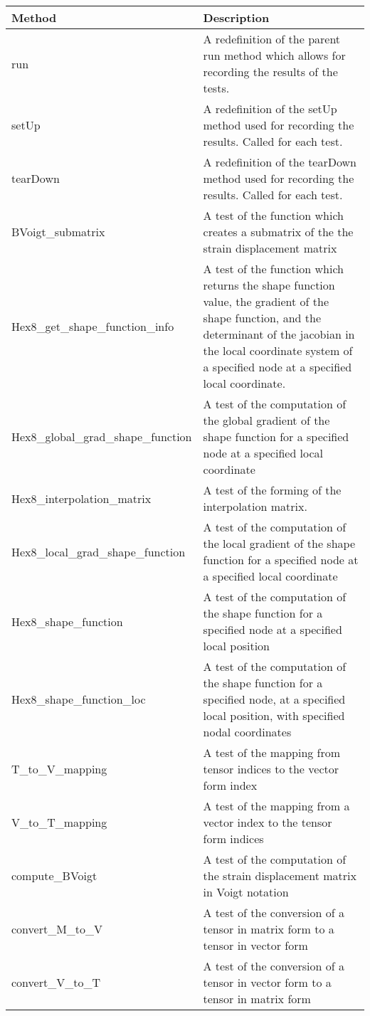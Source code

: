 \documentclass{asme2ej}
\begin{document}
\begin{longtable}{ p{}  p{} }
\hline
Method & Description\\
\hline
\hline
run & A redefinition of the parent run method which allows for recording the results of the tests.\\
setUp & A redefinition of the setUp method used for recording the results. Called for each test.\\
tearDown & A redefinition of the tearDown method used for recording the results. Called for each test.\\
BVoigt\_submatrix & A test of the function which creates a submatrix of the the strain displacement matrix\\
Hex8\_get\_shape\_function\_info & A test of the function which returns the shape function value, the gradient of the shape function, and the determinant of the jacobian in the local coordinate system of a specified node at a specified local coordinate.\\
Hex8\_global\_grad\_shape\_function & A test of the computation of the global gradient of the shape function for a specified node at a specified local coordinate\\
Hex8\_interpolation\_matrix & A test of the forming of the interpolation matrix.\\
Hex8\_local\_grad\_shape\_function & A test of the computation of the local gradient of the shape function for a specified node at a specified local coordinate\\
Hex8\_shape\_function & A test of the computation of the shape function for a specified node at a specified local position\\
Hex8\_shape\_function\_loc & A test of the computation of the shape function for a specified node, at a specified local position, with specified nodal coordinates\\
T\_to\_V\_mapping & A test of the mapping from tensor indices to the vector form index\\
V\_to\_T\_mapping & A test of the mapping from a vector index to the tensor form indices\\
compute\_BVoigt & A test of the computation of the strain displacement matrix in Voigt notation\\
convert\_M\_to\_V & A test of the conversion of a tensor in matrix form to a tensor in vector form\\
convert\_V\_to\_T & A test of the conversion of a tensor in vector form to a tensor in matrix form\\

\end{longtable}
\end{document}
